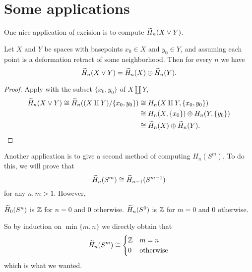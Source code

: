\section{Some applications}
One nice application of excision is to compute $\widetilde H_n(X \vee Y)$.
\begin{theorem}
	Let $X$ and $Y$ be spaces with basepoints $x_0 \in X$ and $y_0 \in Y$,
	and assuming each point is a deformation retract of some neighborhood.
	Then for every $n$ we have
	\[
		\widetilde H_n(X \vee Y)
		= \widetilde H_n(X) \oplus \widetilde H_n(Y).
	\]
\end{theorem}
\begin{proof}
	Apply  with the subset $\{x_0, y_0\}$ of $X \amalg Y$,
	\begin{align*}
		\widetilde H_n (X \vee Y)
		\cong \widetilde H_n( (X \amalg Y) / \{x_0, y_0\} )
		&\cong H_n(X \amalg Y, \{x_0,y_0\}) \\
		&\cong H_n(X, \{x_0\}) \oplus H_n(Y, \{y_0\}) \\
		&\cong\widetilde H_n(X) \oplus \widetilde H_n(Y). \qedhere
	\end{align*}
\end{proof}

Another application is to give a second method
of computing $H_n(S^m)$.
To do this, we will prove that
\[ \widetilde H_n(S^m) \cong \widetilde H_{n-1}(S^{m-1}) \]
for any $n,m > 1$.
However, 
\begin{itemize}
	\ii $\widetilde H_0(S^n)$ is $\mathbb Z$ for $n=0$ and $0$ otherwise.
	\ii $\widetilde H_n(S^0)$ is $\mathbb Z$ for $m=0$ and $0$ otherwise.
\end{itemize}
So by induction on $\min \{m,n\}$ we directly obtain that
\[
	\widetilde H_n(S^m) \cong
	\begin{cases}
		\mathbb Z & m=n \\
		0 & \text{otherwise}
	\end{cases}
\]
which is what we wanted.

